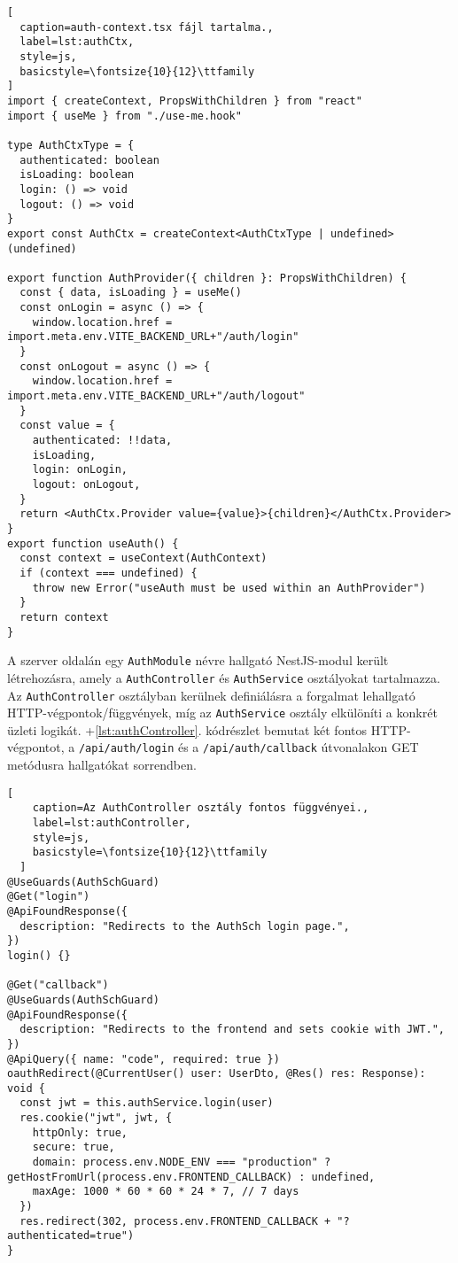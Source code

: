 \begin{minipage}{0.92\textwidth}
  \begin{lstlisting}[
  caption=auth-context.tsx fájl tartalma.,
  label=lst:authCtx,
  style=js,
  basicstyle=\fontsize{10}{12}\ttfamily
]
import { createContext, PropsWithChildren } from "react"
import { useMe } from "./use-me.hook"

type AuthCtxType = {
  authenticated: boolean
  isLoading: boolean
  login: () => void
  logout: () => void
}
export const AuthCtx = createContext<AuthCtxType | undefined>(undefined)

export function AuthProvider({ children }: PropsWithChildren) {
  const { data, isLoading } = useMe()
  const onLogin = async () => {
    window.location.href = import.meta.env.VITE_BACKEND_URL+"/auth/login"
  }
  const onLogout = async () => {
    window.location.href = import.meta.env.VITE_BACKEND_URL+"/auth/logout"
  }
  const value = {
    authenticated: !!data,
    isLoading,
    login: onLogin,
    logout: onLogout,
  }
  return <AuthCtx.Provider value={value}>{children}</AuthCtx.Provider>
}
export function useAuth() {
  const context = useContext(AuthContext)
  if (context === undefined) {
    throw new Error("useAuth must be used within an AuthProvider")
  }
  return context
}
\end{lstlisting}
\end{minipage}

A szerver oldalán egy \verb|AuthModule| névre hallgató NestJS-modul került létrehozásra, amely a \verb|AuthController| és \verb|AuthService| osztályokat tartalmazza. Az \verb|AuthController| osztályban kerülnek definiálásra a forgalmat lehallgató HTTP-végpontok/függvények, míg az \verb|AuthService| osztály elkülöníti a konkrét üzleti logikát. \Az+\ref{lst:authController}. kódrészlet bemutat két fontos HTTP-végpontot, a \verb|/api/auth/login| és a \verb|/api/auth/callback| útvonalakon GET metódusra hallgatókat sorrendben.

\begin{minipage}{0.92\textwidth}
  \begin{lstlisting}[
    caption=Az AuthController osztály fontos függvényei.,
    label=lst:authController,
    style=js,
    basicstyle=\fontsize{10}{12}\ttfamily
  ]
@UseGuards(AuthSchGuard)
@Get("login")
@ApiFoundResponse({
  description: "Redirects to the AuthSch login page.",
})
login() {}

@Get("callback")
@UseGuards(AuthSchGuard)
@ApiFoundResponse({
  description: "Redirects to the frontend and sets cookie with JWT.",
})
@ApiQuery({ name: "code", required: true })
oauthRedirect(@CurrentUser() user: UserDto, @Res() res: Response): void {
  const jwt = this.authService.login(user)
  res.cookie("jwt", jwt, {
    httpOnly: true,
    secure: true,
    domain: process.env.NODE_ENV === "production" ? getHostFromUrl(process.env.FRONTEND_CALLBACK) : undefined,
    maxAge: 1000 * 60 * 60 * 24 * 7, // 7 days
  })
  res.redirect(302, process.env.FRONTEND_CALLBACK + "?authenticated=true")
}
\end{lstlisting}
\end{minipage}

